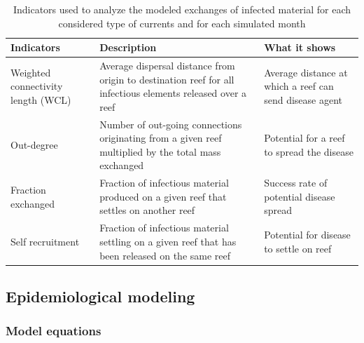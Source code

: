 \documentclass[utf8]{frontiersSCNS}
\begin{document}
\begin{table}
    \centering
    \begin{tabular}{|p{4cm}|p{5cm}|p{4cm}|}
        \hline
        \textbf{Indicators} & \textbf{Description} & \textbf{What it shows} \\
        \hline
            Weighted connectivity length (WCL) & 
            Average dispersal distance from origin to destination reef for all infectious elements released over a reef & 
            Average distance at which a reef can send disease agent \\
        \hline
            Out-degree &
            Number of out-going connections originating from a given reef multiplied by the total mass exchanged  &
            Potential for a reef to spread the disease \\
        \hline
            Fraction exchanged &
            Fraction of infectious material produced on a given reef that settles on another reef &
            Success rate of potential disease spread  \\
        \hline
            Self recruitment &
            Fraction of infectious material settling on a given reef that has been released on the same reef &
            Potential for disease to settle on reef \\
        \hline            
    \end{tabular}
    \caption{Indicators used to analyze the modeled exchanges of infected material for each considered type of currents and for each simulated month}
    \label{tab:indicator}
\end{table}

\subsection{Epidemiological modeling}

\subsubsection{Model equations}
\end{document}
